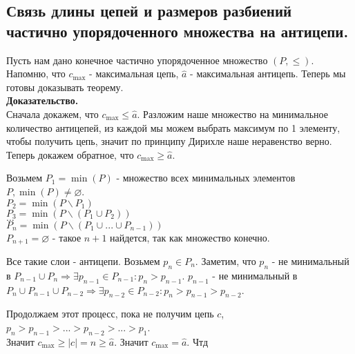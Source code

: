 \subsection{Связь длины цепей и размеров разбиений частично упорядоченного множества на антицепи.}

Пусть нам дано конечное частично упорядоченное множество $(P, \leq)$. Напомню, что $c_{\max}$ - максимальная цепь, $\hat{a}$ - максимальная антицепь.
Теперь мы готовы доказывать теорему.\\

\noindent \textbf{Доказательство.}\\

Сначала докажем, что $c_{\max} \leq \hat{a}$. Разложим наше множество на минимальное количество антицепей, из каждой мы можем выбрать максимум по 1 элементу,
чтобы получить цепь, значит по принципу Дирихле наше неравенство верно.\\

Теперь докажем обратное, что $c_{\max} \geq \hat{a}$.

\begin{center}
    Возьмем $P_1 = \min (P)$ - множество всех минимальных элементов $P, \min (P) \neq \varnothing$.\\
    $P_2 = \min(P \backslash P_1)$\\
    $P_3 = \min(P \backslash (P_1 \cup P_2))$\\
    $\dots$\\
    $P_n = \min(P \backslash (P_1 \cup ... \cup P_{n - 1}))$\\
    $P_{n + 1} = \varnothing$ - такое $n + 1$ найдется, так как множество конечно.
\end{center}

Все такие слои - антицепи. Возьмем $p_n \in P_n$. Заметим, что $p_n$ - не минимальный в $P_{n - 1} \cup P_n \Rightarrow \exists p_{n - 1} \in P_{n - 1} : p_n > p_{n - 1}$.
$p_{n - 1}$ - не минимальный в $P_n \cup P_{n - 1} \cup P_{n - 2} \Rightarrow \exists p_{n - 2} \in P_{n - 2} : p_n > p_{n - 1} > p_{n - 2}$.

Продолжаем этот процесс, пока не получим цепь $c$, $p_n > p_{n - 1} > ... > p_{n - 2} > ... > p_1$.\\

Значит $c_{\max} \geq |c| = n \geq \hat{a}$. Значит $c_{\max} = \hat{a}$. Чтд
